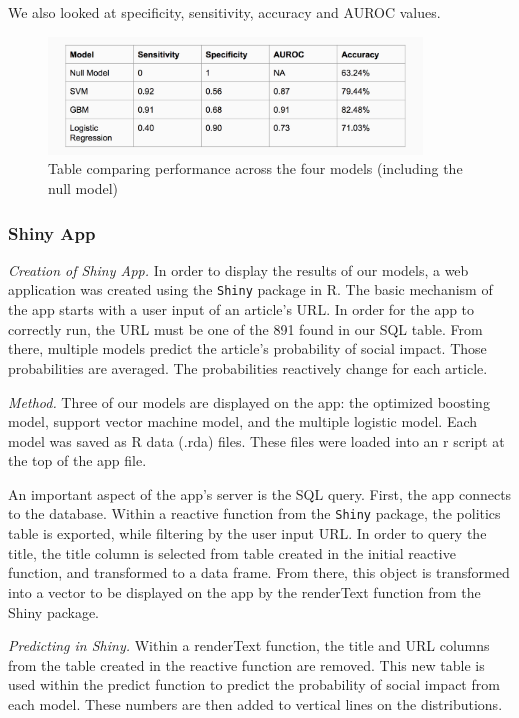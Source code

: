 \documentclass[10pt,letterpaper]{article}
\begin{document}
We also looked at specificity, sensitivity, accuracy and AUROC values.

\begin{figure}
\includegraphics[width=375px]{model-comp} \caption{Table comparing performance across the four models (including the null model)}\label{fig:unnamed-chunk-7}
\end{figure}

\hypertarget{shiny-app}{%
\subsubsection{Shiny App}\label{shiny-app}}

\emph{Creation of Shiny App.} In order to display the results of our
models, a web application was created using the \texttt{Shiny} package
in R. The basic mechanism of the app starts with a user input of an
article's URL. In order for the app to correctly run, the URL must be
one of the 891 found in our SQL table. From there, multiple models
predict the article's probability of social impact. Those probabilities
are averaged. The probabilities reactively change for each article.

\emph{Method.} Three of our models are displayed on the app: the
optimized boosting model, support vector machine model, and the multiple
logistic model. Each model was saved as R data (.rda) files. These files
were loaded into an r script at the top of the app file.

An important aspect of the app's server is the SQL query. First, the app
connects to the database. Within a reactive function from the
\texttt{Shiny} package, the politics table is exported, while filtering
by the user input URL. In order to query the title, the title column is
selected from table created in the initial reactive function, and
transformed to a data frame. From there, this object is transformed into
a vector to be displayed on the app by the renderText function from the
Shiny package.

\emph{Predicting in Shiny.} Within a renderText function, the title and
URL columns from the table created in the reactive function are removed.
This new table is used within the predict function to predict the
probability of social impact from each model. These numbers are then
added to vertical lines on the distributions.
\end{document}
